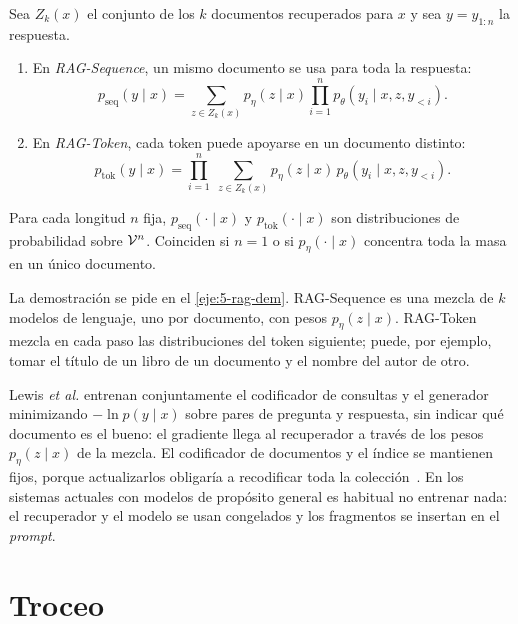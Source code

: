 \begin{definicion}\label{def:rag}
Sea $Z_k(x)$ el conjunto de los $k$ documentos recuperados para $x$ y sea $y=y_{1:n}$ la respuesta.
\begin{enumerate}
  \item En \emph{RAG-Sequence}, un mismo documento se usa para toda la respuesta:
  \[
  p_{\mathrm{seq}}(y\mid x)=\sum_{z\in Z_k(x)}p_\eta(z\mid x)\prod_{i=1}^{n}p_\theta(y_i\mid x,z,y_{<i}).
  \]
  \item En \emph{RAG-Token}, cada token puede apoyarse en un documento distinto:
  \[
  p_{\mathrm{tok}}(y\mid x)=\prod_{i=1}^{n}\;\sum_{z\in Z_k(x)}p_\eta(z\mid x)\,p_\theta(y_i\mid x,z,y_{<i}).
  \]
\end{enumerate}
\end{definicion}

\begin{proposicion}\label{prop:rag}
Para cada longitud $n$ fija, $p_{\mathrm{seq}}(\cdot\mid x)$ y $p_{\mathrm{tok}}(\cdot\mid x)$ son distribuciones de probabilidad sobre $\mathcal{V}^{n}$. Coinciden si $n=1$ o si $p_\eta(\cdot\mid x)$ concentra toda la masa en un único documento.
\end{proposicion}

La demostración se pide en el \cref{eje:5-rag-dem}. RAG-Sequence es una mezcla de $k$ modelos de lenguaje, uno por documento, con pesos $p_\eta(z\mid x)$. RAG-Token mezcla en cada paso las distribuciones del token siguiente; puede, por ejemplo, tomar el título de un libro de un documento y el nombre del autor de otro.

\addtocounter{definicion}{1}%

\begin{observacion}[Entrenamiento]
Lewis \emph{et al.} entrenan conjuntamente el codificador de consultas y el generador minimizando $-\ln p(y\mid x)$ sobre pares de pregunta y respuesta, sin indicar qué documento es el bueno: el gradiente llega al recuperador a través de los pesos $p_\eta(z\mid x)$ de la mezcla. El codificador de documentos y el índice se mantienen fijos, porque actualizarlos obligaría a recodificar toda la colección~\cite[§2.4]{rag}. En los sistemas actuales con modelos de propósito general es habitual no entrenar nada: el recuperador y el modelo se usan congelados y los fragmentos se insertan en el \emph{prompt}.
\end{observacion}

\section{Troceo}

